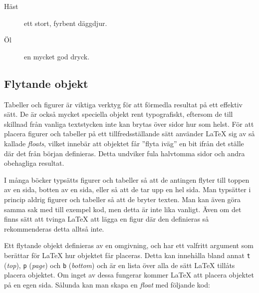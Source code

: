 \documentclass[10pt,../../a4.tex]{subfiles}
\begin{document}
\begin{kod}[tp]
{\begin{minipage}{0.475\textwidth}
\begin{latexcode}
\begin{description}
\item[Häst] ett stort,
    fyrbent däggdjur.
\item[Öl] en mycket god
    dryck.
\end{description}
			\end{latexcode}
		\end{minipage}
		\hfil
		\begin{minipage}{0.475\textwidth} %
		\end{minipage}
	}
	\caption{De tre enkla listomgivningar \LaTeX{} tillhandahåller.}
	\label{ex:listor}
\end{kod}

\subsection{Flytande objekt }\label{sec:floats}
Tabeller och figurer är viktiga verktyg för att förmedla resultat på
ett effektiv sätt. De är också mycket speciella objekt rent typografiskt,
eftersom de till skillnad från vanliga textstycken inte kan brytas över
sidor hur som helst. För att placera figurer och tabeller på ett
tillfredsställande sätt använder \LaTeX{} sig av så kallade \emph{floats},
vilket innebär att objektet får ”flyta iväg” en bit ifrån det ställe där
det från början definieras. Detta undviker fula halvtomma sidor och andra
obehagliga resultat.

I många böcker typsätts figurer och tabeller så att de antingen flyter
till toppen av en sida, botten av en sida, eller så att de tar upp en hel
sida. Man typsätter i princip aldrig figurer och tabeller så att de bryter
texten. Man kan även göra samma sak med till exempel kod, men detta är
inte lika vanligt. Även om det finns sätt att tvinga \LaTeX{} att lägga en
figur där den definieras så rekommenderas detta alltså inte.

Ett flytande objekt definieras av en omgivning, och har ett valfritt
argument som berättar för \LaTeX{} hur objektet får placeras. Detta kan
innehålla bland annat \texttt{t} (\emph{top}), \texttt{p} (\emph{page})
och \texttt{b} (\emph{bottom}) och är en lista över alla de sätt \LaTeX{}
tillåts placera objektet. Om inget av dessa fungerar kommer \LaTeX{} att
placera objektet på en egen sida. Sålunda kan man skapa en \emph{float}
med följande kod:
\begin{latexcode}
\begin{<floattyp>}[tbp] %
\end{<floattyp>}
\end{latexcode}
\end{document}
